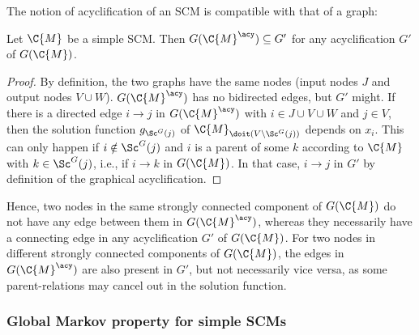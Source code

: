 The notion of acyclification of an SCM is compatible with that of a graph:
\begin{Prp}\label{prp:acyclifications_compatible}
  Let $\C{M}$ be a simple SCM.
  Then $G(\C{M}^\acy) \subseteq G'$ for any acyclification $G'$ of $G(\C{M})$.
\end{Prp}
\begin{proof}
  By definition, the two graphs have the same nodes (input nodes $J$ and output nodes
  $V \cup W$). $G(\C{M}^\acy)$ has no bidirected edges, but $G'$ might. If there is a 
  directed edge $i \to j$ in $G(\C{M}^\acy)$ with $i \in J \cup V \cup W$ and $j \in V$, then
  the solution function $g_{\Sc^G(j)}$ of $\C{M}_{\doit(V\setminus \Sc^G(j))}$ depends on $x_i$. 
  This can only happen if
  $i \notin \Sc^G(j)$ and $i$ is a parent of some $k$ according to $\C{M}$ with $k \in \Sc^G(j)$,
  i.e., if $i \to k$ in $G(\C{M})$. In that case, $i \to j$ in $G'$ by definition of
  the graphical acyclification.
\end{proof}
Hence, two nodes in the same strongly connected component of $G(\C{M})$ do not have any edge between them
in $G(\C{M}^\acy)$, whereas they necessarily have a connecting edge in any acyclification $G'$ of $G(\C{M})$.
For two nodes in different strongly connected components of $G(\C{M})$, the edges in $G(\C{M}^\acy)$ are also
present in $G'$, but not necessarily vice versa, as some parent-relations may cancel out in the solution function.

\subsubsection{Global Markov property for simple SCMs}

